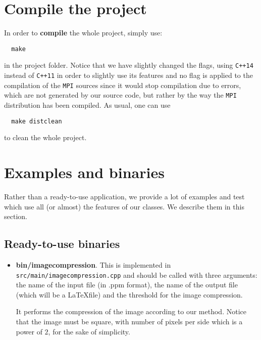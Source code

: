 \documentclass[a4paper,10pt]{article}
\begin{document}
\section{Compile the project}
In order to \textbf{compile} the whole project, simply use:
\begin{center}
 \begin{verbatim}
  make
 \end{verbatim}
\end{center}
in the project folder. Notice that we have slightly changed the flags, using \texttt{C++14} instead of \texttt{C++11} in order to slightly use its features and no flag is applied to the compilation of the \texttt{MPI} sources since it would stop compilation due to errors, which are not generated by our source code, but rather by the way the \texttt{MPI} distribution has been compiled.
As usual, one can use
\begin{center}
 \begin{verbatim}
  make distclean
 \end{verbatim}
\end{center}
to clean the whole project.

\section{Examples and binaries}
Rather than a ready-to-use application, we provide a lot of examples and test which use all (or almost) the features of our classes.
We describe them in this section.

\subsection{Ready-to-use binaries}
\begin{itemize}
 \item \textbf{bin/imagecompression}. This is implemented in \texttt{src/main/imagecompression.cpp} and should be called with three arguments: the name of the input file (in .ppm format), the name of the output file (which will be a \LaTeX file) and the threshold for the image compression.
 
 It performs the compression of the image according to our method. Notice that the image must be square, with number of pixels per side which is a power of $2$, for the sake of simplicity.
\end{itemize}
\end{document}
